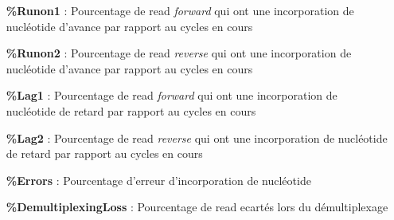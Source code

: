 \begin{itemize}
    \item[\textbf{\%Runon1} :] Pourcentage de read \emph{forward} qui ont une incorporation de nucléotide d'avance par rapport au cycles en cours
    \item[\textbf{\%Runon2} :] Pourcentage de read \emph{reverse} qui ont une incorporation de nucléotide d'avance par rapport au cycles en cours
    \item[\textbf{\%Lag1} :] Pourcentage de read \emph{forward} qui ont une incorporation de nucléotide de retard par rapport au cycles en cours
    \item[\textbf{\%Lag2} :] Pourcentage de read \emph{reverse} qui ont une incorporation de nucléotide de retard par rapport au cycles en cours
    \item[\textbf{\%Errors} :] Pourcentage d'erreur d'incorporation de nucléotide
    \item[\textbf{\%DemultiplexingLoss} :] Pourcentage de read ecartés lors du démultiplexage
\end{itemize}





